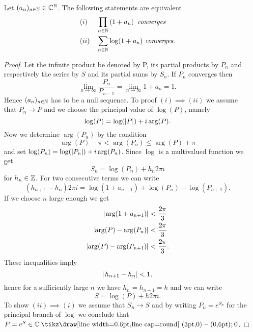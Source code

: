 \begin{lemma}
	Let $(a_n)_{n \in \mathbb{N}} \in \mathbb{C}^{\mathbb{N}}$. The following statements are equivalent
\begin{equation*}
\begin{aligned}
	&(i) &&\prod_{n \in \mathbb{N}} \left(1 + a_n\right) \textit{ converges} \\
	&(ii) &&\sum_{n \in \mathbb{N}} \log(1 + a_n) \textit{ converges}.
\end{aligned}
\end{equation*}
\end{lemma}
\begin{proof} Let the infinite product be denoted by P, its partial products by $P_n$ and respectively the series by $S$ and its partial sums by $S_n$. If $P_n$ converges then
\begin{equation*}
	\lim\limits_{n \to \infty} \frac{P_n}{P_{n - 1}} = \lim\limits_{n \to \infty} 1 + a_n = 1.
\end{equation*}
	Hence $(a_n)_{n \in \mathbb{N}}$ has to be a null sequence. To proof $(i) \implies (ii)$ we assume that $P_n \to P$ and we choose the principal value of $\log(P)$, namely
\begin{equation*}
	\log(P) = \log(\left|P\right|) + i \arg(P).
\end{equation*}
	Now we determine $\arg(P_n)$ by the condition
\begin{equation*}	
	\arg(P) - \pi < \arg(P_n) \leq \arg(P) + \pi
\end{equation*}
	and set $\log(P_n) = \log(\left|P_n\right|) + i \arg(P_n)$. Since $\log$ is a multivalued function we get
\begin{equation*}
	S_n = \log(P_n) + h_n 2 \pi i
\end{equation*}
	for $h_n \in \mathbb{Z}$. For two consecutive terms we can write
\begin{equation*}
	(h_{n + 1} - h_n) 2 \pi i = \log(1 + a_{n + 1}) + \log(P_n) - \log(P_{n + 1}).
\end{equation*}
	If we choose $n$ large enough we get
\begin{equation*}
\begin{aligned}
	\left|\arg(1 + a_{n + 1})\right| &< \frac{2 \pi}{3} \\
	\left|\arg(P) - \arg(P_n)\right| &< \frac{2 \pi}{3} \\
	\left|\arg(P) - \arg(P_{n + 1})\right| &< \frac{2 \pi}{3}.
\end{aligned}
\end{equation*}
	These inequalities imply
\begin{equation*}
	\left|h_{n + 1} - h_n\right| < 1,
\end{equation*}
	hence for a sufficiently large $n$ we have $h_n = h_{n + 1} = h$ and we can write
\begin{equation*}
	S = \log(P) + h 2 \pi i.
\end{equation*}
	To show $(ii) \implies (i)$ we assume that $S_n \to S$ and by writing $P_n = e^{S_n}$ for the principal branch of $\log$ we conclude that $P = e^{S} \in \field{C} \mysetminus {0}$.
\end{proof}


